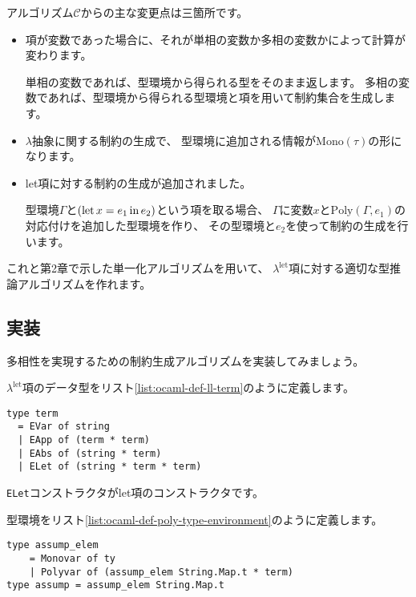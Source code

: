 アルゴリズム$\mathcal C$からの主な変更点は三箇所です。

\begin{itemize}
  \item 項が変数であった場合に、それが単相の変数か多相の変数かによって計算が変わります。

        単相の変数であれば、型環境から得られる型をそのまま返します。
        多相の変数であれば、型環境から得られる型環境と項を用いて制約集合を生成します。

  \item $\lambda$抽象に関する制約の生成で、
        型環境に追加される情報が$\mathrm{Mono}(\tau)$の形になります。

  \item let項に対する制約の生成が追加されました。

        型環境$\Gamma$と$(\mathrm{let} \, x = e_1 \, \mathrm{in} \, e_2)$という項を取る場合、
        $\Gamma$に変数$x$と$\mathrm{Poly}(\Gamma, e_1)$の対応付けを追加した型環境を作り、
        その型環境と$e_2$を使って制約の生成を行います。
\end{itemize}

これと第2章で示した単一化アルゴリズムを用いて、
$\lambda^\mathrm{let}$項に対する適切な型推論アルゴリズムを作れます。

\subsection{実装}

多相性を実現するための制約生成アルゴリズムを実装してみましょう。

$\lambda^\mathrm{let}$項のデータ型をリスト\ref{list:ocaml-def-ll-term}のように定義します。

\begin{lstlisting}[caption=$\lambda^\mathrm{let}$項の定義, label=list:ocaml-def-ll-term]
type term
  = EVar of string
  | EApp of (term * term)
  | EAbs of (string * term)
  | ELet of (string * term * term)
\end{lstlisting}

\texttt{ELet}コンストラクタがlet項のコンストラクタです。

型環境をリスト\ref{list:ocaml-def-poly-type-environment}のように定義します。

\begin{lstlisting}[caption=型環境の定義, label=list:ocaml-def-poly-type-environment]
type assump_elem
    = Monovar of ty
    | Polyvar of (assump_elem String.Map.t * term)
type assump = assump_elem String.Map.t
\end{lstlisting}

